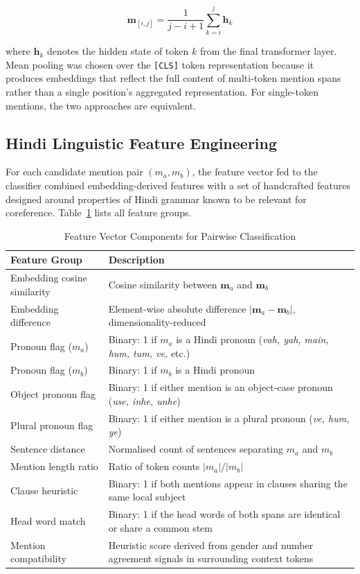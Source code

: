 \documentclass[12pt,a4paper]{report}
\begin{document}
\begin{equation}
\mathbf{m}_{[i,j]} = \frac{1}{j - i + 1} \sum_{k=i}^{j} \mathbf{h}_k
\end{equation}

\noindent where $\mathbf{h}_k$ denotes the hidden state of token $k$ from the final transformer layer. Mean pooling was chosen over the \texttt{[CLS]} token representation because it produces embeddings that reflect the full content of multi-token mention spans rather than a single position's aggregated representation. For single-token mentions, the two approaches are equivalent.

\subsection{Hindi Linguistic Feature Engineering}

For each candidate mention pair $(m_a, m_b)$, the feature vector fed to the classifier combined embedding-derived features with a set of handcrafted features designed around properties of Hindi grammar known to be relevant for coreference. Table~\ref{tab:features} lists all feature groups.

\begin{table}[H]
\centering
\caption{Feature Vector Components for Pairwise Classification}
\label{tab:features}
\begin{tabular}{|l|p{8.2cm}|}
\hline
\textbf{Feature Group} & \textbf{Description} \\
\hline
Embedding cosine similarity & Cosine similarity between $\mathbf{m}_a$ and $\mathbf{m}_b$ \\
Embedding difference & Element-wise absolute difference $|\mathbf{m}_a - \mathbf{m}_b|$, dimensionality-reduced \\
Pronoun flag ($m_a$) & Binary: 1 if $m_a$ is a Hindi pronoun (\textit{vah, yah, main, hum, tum, ve,} etc.) \\
Pronoun flag ($m_b$) & Binary: 1 if $m_b$ is a Hindi pronoun \\
Object pronoun flag & Binary: 1 if either mention is an object-case pronoun (\textit{use, inhe, unhe}) \\
Plural pronoun flag & Binary: 1 if either mention is a plural pronoun (\textit{ve, hum, ye}) \\
Sentence distance & Normalised count of sentences separating $m_a$ and $m_b$ \\
Mention length ratio & Ratio of token counts $|m_a| / |m_b|$ \\
Clause heuristic & Binary: 1 if both mentions appear in clauses sharing the same local subject \\
Head word match & Binary: 1 if the head words of both spans are identical or share a common stem \\
Mention compatibility & Heuristic score derived from gender and number agreement signals in surrounding context tokens \\
\hline
\end{tabular}
\end{table}
\end{document}
